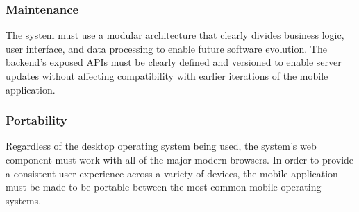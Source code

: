 \subsubsection{Maintenance}
The system must use a modular architecture that clearly divides business logic, user interface, and data processing to enable future software evolution.
The backend's exposed APIs must be clearly defined and versioned to enable server updates without affecting compatibility with earlier iterations of the mobile application.

\subsubsection{Portability}
Regardless of the desktop operating system being used, the system's web component must work with all of the major modern browsers.
In order to provide a consistent user experience across a variety of devices, the mobile application must be made to be portable between the most common mobile operating systems.